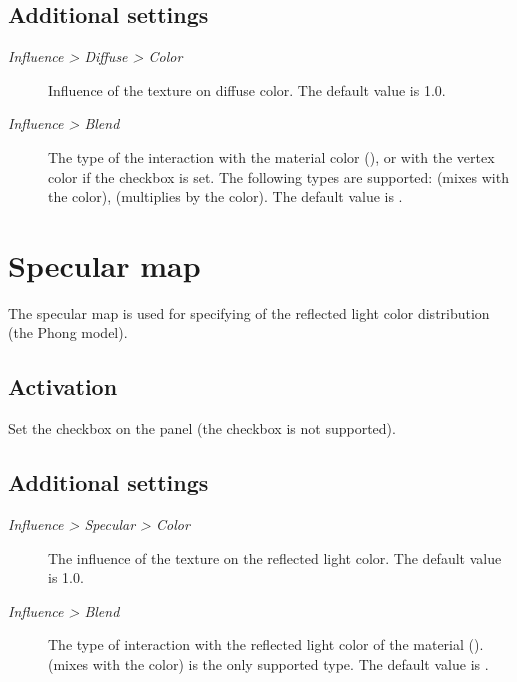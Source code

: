 \documentclass[a4paper,12pt,oneside]{sphinxmanual}
\begin{document}
\subsection{Additional settings}
\label{textures:id5}\begin{description}
\item[{\emph{Influence \textgreater{} Diffuse \textgreater{} Color}}] \leavevmode
Influence of the texture on diffuse color. The default value is 1.0.

\item[{\emph{Influence \textgreater{} Blend}}] \leavevmode
The type of the interaction with the material color (), or with the vertex color if the  checkbox is set. The following types are supported:  (mixes with the color),  (multiplies by the color). The default value is .

\end{description}


\section{Specular map}
\label{textures:index-5}\label{textures:specular-map}
The specular map is used for specifying of the reflected light color distribution (the Phong model).


\subsection{Activation}
\label{textures:id6}
Set the  checkbox on the  panel (the  checkbox is not supported).


\subsection{Additional settings}
\label{textures:id7}\begin{description}
\item[{\emph{Influence \textgreater{} Specular \textgreater{} Color}}] \leavevmode
The influence of the texture on the reflected light color. The default value is 1.0.

\item[{\emph{Influence \textgreater{} Blend}}] \leavevmode
The type of interaction with the reflected light color of the material ().  (mixes with the color) is the only supported type. The default value is .

\end{description}
\end{document}

